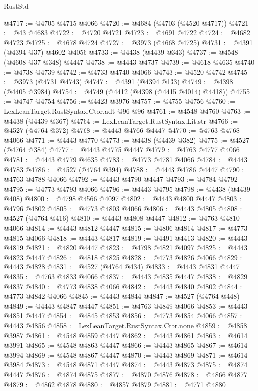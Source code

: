 \begin{lexlean}{RustStd}
\begin{coremodule}
{\begin{coremodule}
{{{{{{{{{{{{{{{{{{{{{{{{{{{{{{{{{{{{{{{{{{{{{{{{{{{{{{{{{{{{{{{{{{{{@4717 := @4705 @4715 @4066
@4720 := @4684 (@4703 (@4520 @4717))
@4721 := @43 @4683
@4722 := @4720 @4721
@4723 := @4691 @4722
@4724 := @4682 @4723
@4725 := @4678 @4724
@4727 := @3973 (@4668 @4725)
@4731 := @4391 (@4394 @37) @4602 @4056
@4733 := @4438 (@4439 @343)
@4737 := @4548 (@4608 @37 @348) @4447
@4738 := @4443 @4737
@4739 := @4618 @4635
@4740 := @4738 @4739
@4742 := @4733 @4740 @4066
@4743 := @4520 @4742
@4745 := @3973 (@4731 @4743)
@4747 := @4391 (@4394 @133)
@4749 := @4398 (@4405 @3984)
@4754 := @4749 (@4412 (@4398 (@4415 @4014) @4418))
@4755 := @4747 @4754
@4756 := @4423 @3976
@4757 := @4755 @4756
@4760 := LexLeanTarget.RustSyntax.Ctor.adt @96 @96
@4761 := @4548 @4760
@4763 := @4438 (@4439 @367)
@4764 := LexLeanTarget.RustSyntax.Lit.str
@4766 := @4527 (@4764 @372)
@4768 := @4443 @4766 @4447
@4770 := @4763 @4768 @4066
@4771 := @4443 @4770
@4773 := @4438 (@4439 @382)
@4775 := @4527 (@4764 @384)
@4777 := @4443 @4775 @4447
@4779 := @4763 @4777 @4066
@4781 := @4443 @4779 @4635
@4783 := @4773 @4781 @4066
@4784 := @4443 @4783
@4786 := @4527 (@4764 @394)
@4788 := @4443 @4786 @4447
@4790 := @4763 @4788 @4066
@4792 := @4443 @4790 @4447
@4793 := @4784 @4792
@4795 := @4773 @4793 @4066
@4796 := @4443 @4795
@4798 := @4438 (@4439 @408)
@4800 := @4798 @4566 @4097
@4802 := @4443 @4800 @4447
@4803 := @4796 @4802
@4805 := @4773 @4803 @4066
@4806 := @4443 @4805
@4808 := @4527 (@4764 @416)
@4810 := @4443 @4808 @4447
@4812 := @4763 @4810 @4066
@4814 := @4443 @4812 @4447
@4815 := @4806 @4814
@4817 := @4773 @4815 @4066
@4818 := @4443 @4817
@4819 := @4491 @4413
@4820 := @4443 @4819
@4821 := @4820 @4447
@4823 := @4798 @4821 @4097
@4825 := @4443 @4823 @4447
@4826 := @4818 @4825
@4828 := @4773 @4826 @4066
@4829 := @4443 @4828
@4831 := @4527 (@4764 @434)
@4833 := @4443 @4831 @4447
@4835 := @4763 @4833 @4066
@4837 := @4443 @4835 @4447
@4838 := @4829 @4837
@4840 := @4773 @4838 @4066
@4842 := @4443 @4840 @4802
@4844 := @4773 @4842 @4066
@4845 := @4443 @4844
@4847 := @4527 (@4764 @448)
@4849 := @4443 @4847 @4447
@4851 := @4763 @4849 @4066
@4853 := @4443 @4851 @4447
@4854 := @4845 @4853
@4856 := @4773 @4854 @4066
@4857 := @4443 @4856
@4858 := LexLeanTarget.RustSyntax.Ctor.none
@4859 := @4858 @3987
@4861 := @4548 @4859 @4447
@4862 := @4443 @4861
@4863 := @4614 @3991
@4865 := @4548 @4863 @4447
@4866 := @4443 @4865
@4867 := @4614 @3994
@4869 := @4548 @4867 @4447
@4870 := @4443 @4869
@4871 := @4614 @3984
@4873 := @4548 @4871 @4447
@4874 := @4443 @4873
@4875 := @4874 @4447
@4876 := @4874 @4875
@4877 := @4870 @4876
@4878 := @4866 @4877
@4879 := @4862 @4878
@4880 := @4857 @4879
@4881 := @4771 @4880
}}}}}}}}}}}}}}}}}}}}}}}}}}}}}}}}}}}}}}}}}}}}}}}}}}}}}}}}}}}}}}}}}}}}
\end{coremodule}}
\end{coremodule}
\end{lexlean}
